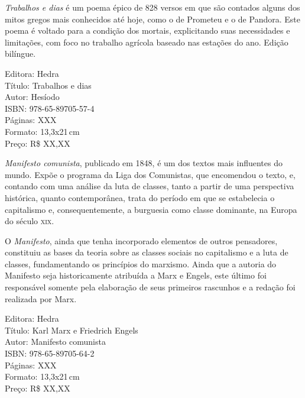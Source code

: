 \noindent{}\textit{Trabalhos e dias} é um poema épico de 828 versos em que são contados alguns dos mitos gregos mais conhecidos até hoje, como o de Prometeu e o de Pandora. Este poema é voltado para a condição dos mortais, explicitando suas necessidades e limitações, com foco no trabalho agrícola baseado nas estações do ano. Edição bilíngue.

\begin{ficha}
Editora: Hedra\\
Título: Trabalhos e dias\\
Autor: Hesíodo\\ 
ISBN: 978-65-89705-57-4\\
Páginas: XXX\\
Formato: 13,3x21\,cm\\
Preço: R\$ XX,XX\\
\end{ficha}

\pagebreak


\noindent{}\textit{Manifesto comunista}, publicado em 1848, é um dos textos mais influentes do mundo. Expõe o programa da Liga dos Comunistas, que encomendou o texto, e, contando com uma análise da luta de classes, tanto a partir de uma perspectiva histórica, quanto contemporânea, trata do período em que se estabelecia o capitalismo e, consequentemente, a burguesia como classe dominante, na Europa do século \textsc{xix}.

O \textit{Manifesto}, ainda que tenha incorporado elementos de outros pensadores, constituiu as bases da teoria sobre as classes sociais no capitalismo e a luta de classes, fundamentando os princípios do marxismo. Ainda que a autoria do Manifesto seja historicamente atribuída a Marx e Engels, este último foi responsável somente pela elaboração de seus primeiros rascunhos e a redação foi realizada por Marx.

\begin{ficha}
Editora: Hedra\\
Título: Karl Marx e Friedrich Engels\\
Autor: Manifesto comunista\\ 
ISBN: 978-65-89705-64-2\\
Páginas: XXX\\
Formato: 13,3x21\,cm\\
Preço: R\$ XX,XX\\
\end{ficha}

\pagebreak

